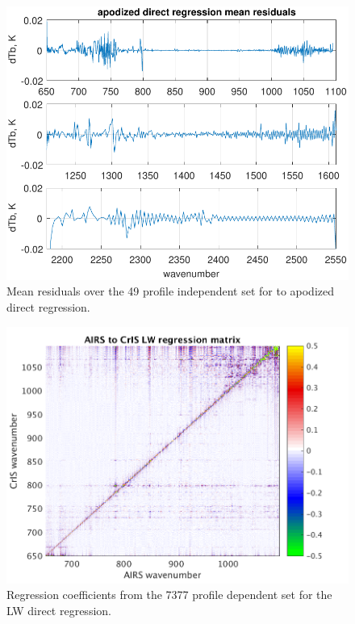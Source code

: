 \documentclass[journal]{IEEEtran}
\begin{document}
\begin{figure} %
  \centering
  \includegraphics[width=\linewidth]{figures/ap_dir_regr.pdf}
  \caption{Mean residuals over the 49 profile independent set for
    {\airs} to apodized {\cris} direct regression.}
  \label{dreg1}
\end{figure}

\begin{figure} %
  \centering
  \includegraphics[width=\linewidth]{figures/LW_dir_regr_mat.png}
  \caption{Regression coefficients from the 7377 profile dependent set for
  the LW direct regression.}
  \label{dreg3}
\end{figure}
\end{document}
